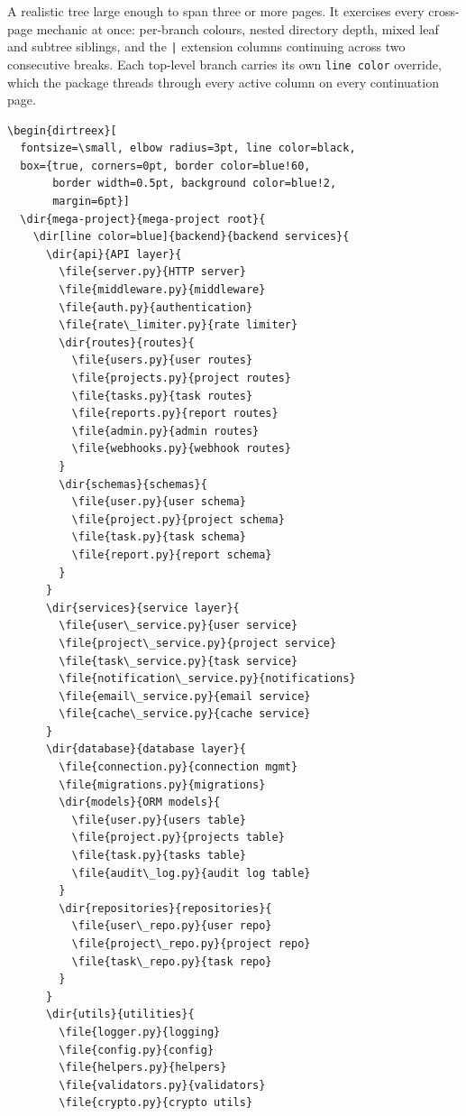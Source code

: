 \documentclass[11pt]{article}
\begin{document}
A realistic tree large enough to span three or more pages. It exercises every cross-page mechanic at once: per-branch colours, nested directory depth, mixed leaf and subtree siblings, and the \texttt{|} extension columns continuing across two consecutive breaks. Each top-level branch carries its own \texttt{line color} override, which the package threads through every active column on every continuation page.

\begin{Verbatim}
\begin{dirtreex}[
  fontsize=\small, elbow radius=3pt, line color=black,
  box={true, corners=0pt, border color=blue!60,
       border width=0.5pt, background color=blue!2,
       margin=6pt}]
  \dir{mega-project}{mega-project root}{
    \dir[line color=blue]{backend}{backend services}{
      \dir{api}{API layer}{
        \file{server.py}{HTTP server}
        \file{middleware.py}{middleware}
        \file{auth.py}{authentication}
        \file{rate\_limiter.py}{rate limiter}
        \dir{routes}{routes}{
          \file{users.py}{user routes}
          \file{projects.py}{project routes}
          \file{tasks.py}{task routes}
          \file{reports.py}{report routes}
          \file{admin.py}{admin routes}
          \file{webhooks.py}{webhook routes}
        }
        \dir{schemas}{schemas}{
          \file{user.py}{user schema}
          \file{project.py}{project schema}
          \file{task.py}{task schema}
          \file{report.py}{report schema}
        }
      }
      \dir{services}{service layer}{
        \file{user\_service.py}{user service}
        \file{project\_service.py}{project service}
        \file{task\_service.py}{task service}
        \file{notification\_service.py}{notifications}
        \file{email\_service.py}{email service}
        \file{cache\_service.py}{cache service}
      }
      \dir{database}{database layer}{
        \file{connection.py}{connection mgmt}
        \file{migrations.py}{migrations}
        \dir{models}{ORM models}{
          \file{user.py}{users table}
          \file{project.py}{projects table}
          \file{task.py}{tasks table}
          \file{audit\_log.py}{audit log table}
        }
        \dir{repositories}{repositories}{
          \file{user\_repo.py}{user repo}
          \file{project\_repo.py}{project repo}
          \file{task\_repo.py}{task repo}
        }
      }
      \dir{utils}{utilities}{
        \file{logger.py}{logging}
        \file{config.py}{config}
        \file{helpers.py}{helpers}
        \file{validators.py}{validators}
        \file{crypto.py}{crypto utils}

\end{Verbatim}
\end{document}
